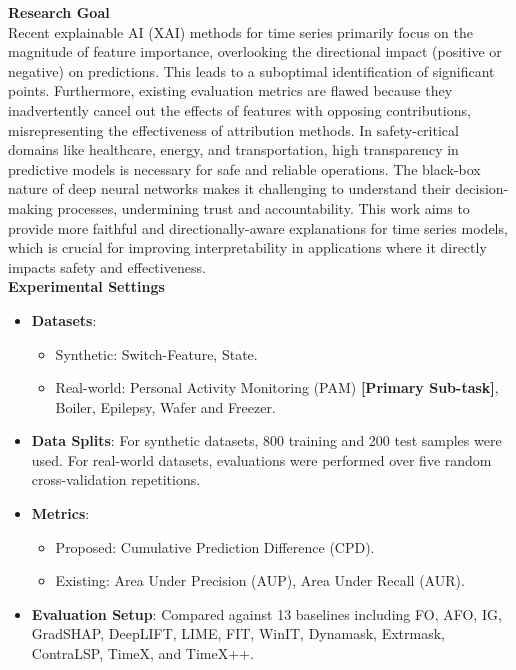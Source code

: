 \documentclass[11pt]{article}
\theoremstyle{plain}
\theoremstyle{definition}
\theoremstyle{remark}
\begin{document}
\begin{tcolorbox}[
    colback=white,
    colframe=myPastelGreen,
    title=\textbf{\textcolor{black}{Task Description}},
    boxrule=0.5mm,
    width=\linewidth,
    arc=2mm,
    boxsep=5pt,
    left=6pt, right=6pt, top=6pt, bottom=6pt,
]

\textbf{Research Goal}\\
Recent explainable AI (XAI) methods for time series primarily focus on the magnitude of feature importance, overlooking the directional impact (positive or negative) on predictions. This leads to a suboptimal identification of significant points. Furthermore, existing evaluation metrics are flawed because they inadvertently cancel out the effects of features with opposing contributions, misrepresenting the effectiveness of attribution methods. In safety-critical domains like healthcare, energy, and transportation, high transparency in predictive models is necessary for safe and reliable operations. The black-box nature of deep neural networks makes it challenging to understand their decision-making processes, undermining trust and accountability. This work aims to provide more faithful and directionally-aware explanations for time series models, which is crucial for improving interpretability in applications where it directly impacts safety and effectiveness.\\

\textbf{Experimental Settings}
\begin{itemize}[noitemsep, nolistsep]
    \item \textbf{Datasets}:
    \begin{itemize}[noitemsep, nolistsep]
        \item Synthetic: Switch-Feature, State.
        \item Real-world: Personal Activity Monitoring (PAM) \textbf{[Primary Sub-task]}, Boiler, Epilepsy, Wafer and Freezer.
    \end{itemize}
    \item \textbf{Data Splits}: For synthetic datasets, 800 training and 200 test samples were used. For real-world datasets, evaluations were performed over five random cross-validation repetitions.
    \item \textbf{Metrics}:
    \begin{itemize}[noitemsep, nolistsep]
        \item Proposed: Cumulative Prediction Difference (CPD).
        \item Existing: Area Under Precision (AUP), Area Under Recall (AUR).
    \end{itemize}
    \item \textbf{Evaluation Setup}: Compared against 13 baselines including FO, AFO, IG, GradSHAP, DeepLIFT, LIME, FIT, WinIT, Dynamask, Extrmask, ContraLSP, TimeX, and TimeX++.\\
\end{itemize}  


\end{tcolorbox}
\end{document}
